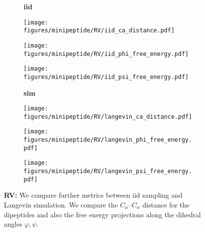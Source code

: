 \begin{figure}
    \centering
    \begin{minipage}{\textwidth}
        \centering
        \begin{subfigure}[c]{0.08\textwidth}
            \textbf{iid}
        \end{subfigure}
        \begin{subfigure}[c]{0.2\textwidth}
            \centering
            \texttt{[image: figures/minipeptide/RV/iid\_ca\_distance.pdf]}            
        \end{subfigure}
        \hspace{0.5cm}
        \begin{subfigure}[c]{0.2\textwidth}
            \centering
            \texttt{[image: figures/minipeptide/RV/iid\_phi\_free\_energy.pdf]}
        \end{subfigure}
        \hspace{0.5cm}
        \begin{subfigure}[c]{0.2\textwidth}
            \centering
            \texttt{[image: figures/minipeptide/RV/iid\_psi\_free\_energy.pdf]}
        \end{subfigure}
    \end{minipage}
    \vspace{0.5cm}
    \begin{minipage}{\textwidth}
        \centering
        \begin{subfigure}[c]{0.08\textwidth}
            \vspace{-0.5cm}
            \textbf{sim}
        \end{subfigure}
        \begin{subfigure}[c]{0.2\textwidth}
            \centering
            \texttt{[image: figures/minipeptide/RV/langevin\_ca\_distance.pdf]}
        \end{subfigure}
        \hspace{0.5cm}
        \begin{subfigure}[c]{0.2\textwidth}
            \centering
            \texttt{[image: figures/minipeptide/RV/langevin\_phi\_free\_energy.pdf]}
        \end{subfigure}
        \hspace{0.5cm}
        \begin{subfigure}[c]{0.2\textwidth}
            \centering
            \texttt{[image: figures/minipeptide/RV/langevin\_psi\_free\_energy.pdf]}
        \end{subfigure}
    \end{minipage}
    \caption{\textbf{RV:} We compare further metrics between iid sampling and Langevin simulation. We compare the $C_\alpha$--$C_\alpha$ distance for the dipeptides and also the free energy projections along the dihedral angles $\varphi, \psi$.}
    \label{fig:minipeptide-rv-more-metrics}
\end{figure}